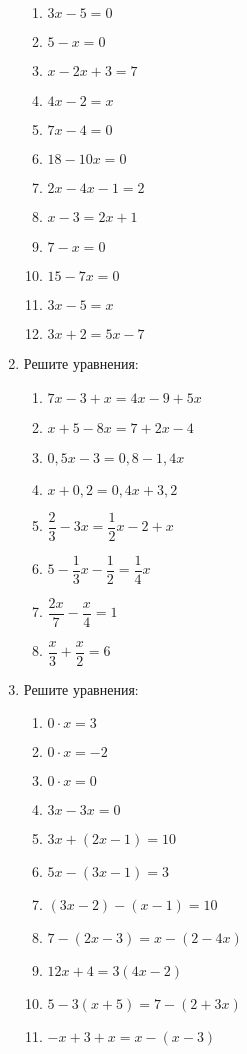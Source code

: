 \documentclass[12pt, a4paper]{article}
\begin{document}
\begin{enumerate}
\begin{multicols}{3}
\begin{enumerate}[label=\asbuk*)]
			\item $3x-5=0$
			\item $5-x=0$
			\item $x-2x+3=7$
			\item $4x-2=x$
			\item $7x-4=0$
			\item $18-10x=0$
			\item $2x-4x-1=2$
			\item $x-3=2x+1$
			\item $7-x=0$
			\item $15-7x=0$
			\item $3x-5=x$
			\item $3x+2=5x-7$
		\end{enumerate}
	\end{multicols}
	\item Решите уравнения:
	\begin{multicols}{2}
		\begin{enumerate}[label=\asbuk*)]
			\item $7x-3+x=4x-9+5x$
			\item $x+5-8x=7+2x-4$
			\item $0,5x-3=0,8-1,4x$
			\item $x+0,2=0,4x+3,2$
			\item $\dfrac{2}{3}-3x=\dfrac{1}{2}x-2+x$
			\item $5-\dfrac{1}{3}x-\dfrac{1}{2}=\dfrac{1}{4}x$
			\item $\dfrac{2x}{7}-\dfrac{x}{4}=1$
			\item $\dfrac{x}{3}+\dfrac{x}{2}=6$
		\end{enumerate}
	\end{multicols}
	\item Решите уравнения:
	\begin{multicols}{2}
		\begin{enumerate}[label=\asbuk*)]
			\item $0\cdot x = 3$
			\item $0\cdot x = -2$
			\item $0\cdot x = 0$
			\item $3x-3x=0$
			\item $3x+(2x-1)=10$
			\item $5x-(3x-1)=3$
			\item $(3x-2)-(x-1)=10$
			\item $7-(2x-3)=x-(2-4x)$
			\item $12x+4=3(4x-2)$
			\item $5-3(x+5)=7-(2+3x)$
			\item $-x+3+x=x-(x-3)$

\end{enumerate}
\end{multicols}
\end{enumerate}
\end{document}
